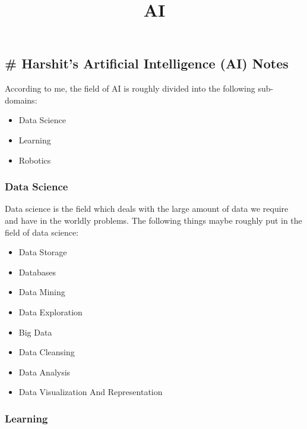 \documentclass[11pt]{article}
\title{AI}
\providecommand{\tightlist}{%
      \setlength{\itemsep}{0pt}\setlength{\parskip}{0pt}}
\begin{document}
    
    
    \maketitle
    
    

    
    \hypertarget{harshits-artificial-intelligence-ai-notes}{%
\subsection{\# Harshit's Artificial Intelligence (AI)
Notes}\label{harshits-artificial-intelligence-ai-notes}}

    According to me, the field of AI is roughly divided into the following
sub-domains:

\begin{itemize}
\tightlist
\item
  Data Science
\item
  Learning
\item
  Robotics
\end{itemize}

\hypertarget{data-science}{%
\subsubsection{Data Science}\label{data-science}}

Data science is the field which deals with the large amount of data we
require and have in the worldly problems. The following things maybe
roughly put in the field of data science:

\begin{itemize}
\tightlist
\item
  Data Storage
\item
  Databases
\item
  Data Mining
\item
  Data Exploration
\item
  Big Data
\item
  Data Cleansing
\item
  Data Analysis
\item
  Data Visualization And Representation
\end{itemize}

    \hypertarget{learning}{%
\subsubsection{Learning}\label{learning}}
\end{document}
